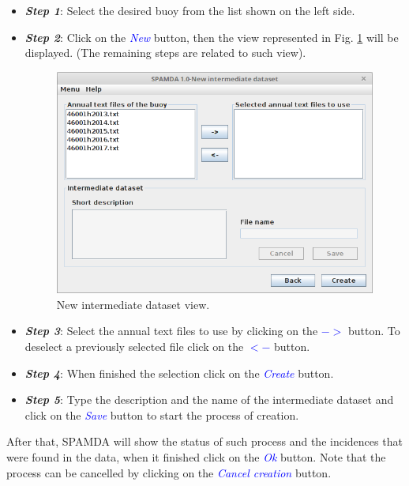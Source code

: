 \begin{onehalfspace}
					\begin{itemize}\itemsep0.02cm
						\item \textit{\textbf{Step 1}}: Select the desired buoy from the list shown on the left side.
						\item \textit{\textbf{Step 2}}: Click on the \textcolor{blue}{\textit{New}} button, then the view represented in Fig. \ref{fig:creatingIntermediateDataset} will be displayed. (The remaining steps are related to such view).
							\begin{figure}[ht!]
								\centering
								\includegraphics[scale=0.38]{figures/creatingIntermediateDataset.png}
								\caption{New intermediate dataset view.}
								\label{fig:creatingIntermediateDataset}
							\end{figure}
						\item \textit{\textbf{Step 3}}: Select the annual text files to use by clicking on the \textcolor{blue}{\textit{$-$$>$}} button. To deselect a previously selected file click on the \textcolor{blue}{\textit{$<$$-$}} button.
						\item \textit{\textbf{Step 4}}: When finished the selection click on the \textcolor{blue}{\textit{Create}} button.
						\item \textit{\textbf{Step 5}}: Type the description and the name of the intermediate dataset and click on the \textcolor{blue}{\textit{Save}} button to start the process of creation.
					\end{itemize}
					
				After that, SPAMDA will show the status of such process and the incidences that were found in the data, when it finished click on the \textcolor{blue}{\textit{Ok}} button. Note that the process can be cancelled by clicking on the \textcolor{blue}{\textit{Cancel creation}} button.
				

\end{onehalfspace}
